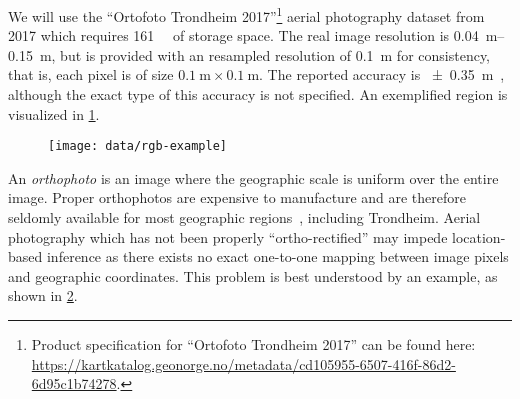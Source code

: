 We will use the \enquote{Ortofoto Trondheim 2017}\footnote{Product specification for \enquote{Ortofoto Trondheim 2017} can be found here:\\ \url{https://kartkatalog.geonorge.no/metadata/cd105955-6507-416f-86d2-6d95c1b74278}.} aerial photography dataset from 2017 which requires \SI{161}{\giga\byte} of storage space.
The real image resolution is \SIrange{0.04}{0.15}{\meter}, but is provided with an resampled resolution of \SI{0.1}{\meter} for consistency, that is, each pixel is of size $\SI{0.1}{\meter} \times \SI{0.1}{\meter}$.
The reported accuracy is \SI{\pm 0.35}{\meter}~\cite{trondheim_ortophoto_2017}, although the exact type of this accuracy is not specified.
An exemplified region is visualized in \cref{fig:rgb-example}.

\begin{figure}[hbt]
  \centering
  \texttt{[image: data/rgb-example]}
  \label{fig:rgb-example}
\end{figure}

An \textit{orthophoto} is an image where the geographic scale is uniform over the entire image.
Proper orthophotos are expensive to manufacture and are therefore seldomly available for most geographic regions~\cite{ortofoto_in_norway_2003}, including Trondheim.
Aerial photography which has not been properly \enquote{ortho-rectified} may impede location-based inference as there exists no exact one-to-one mapping between image pixels and geographic coordinates.
This problem is best understood by an example, as shown in \cref{fig:non-orthophoto-example}.

\begin{figure}[hbt]
  \centering
  \label{fig:non-orthophoto-example}
\end{figure}

